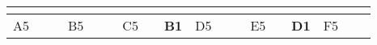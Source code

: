 \begin{landscape}
\begin{table}[h!]
\begin{tabular}{lcllcllcllcllcllcl}
                          & \multicolumn{1}{l}{}                                                                                                     &                              &                                                 & \multicolumn{1}{l}{}                                                                                                                                &                                                       &                         & \multicolumn{1}{l}{}                                                                                                     &                               &                                                 & \multicolumn{1}{l}{}                                                                                                                      &                                                       &                         & \multicolumn{1}{l}{}                                                                                                                &                               &                                                 & \multicolumn{1}{l}{}                                                                                                                                  &                                                       \\ \hline
\multicolumn{1}{|l|}{A5}  & \multicolumn{1}{c|}{}                                                                                                    & \multicolumn{1}{l|}{}        & \multicolumn{1}{l|}{\cellcolor[HTML]{C0C0C0}B5} & \multicolumn{1}{c|}{\cellcolor[HTML]{C0C0C0}}                                                                                                       & \multicolumn{1}{l|}{\cellcolor[HTML]{C0C0C0}{\bf A5}} & \multicolumn{1}{l|}{C5} & \multicolumn{1}{c|}{}                                                                                                    & \multicolumn{1}{l|}{{\bf B1}} & \multicolumn{1}{l|}{\cellcolor[HTML]{C0C0C0}D5} & \multicolumn{1}{c|}{\cellcolor[HTML]{C0C0C0}}                                                                                             & \multicolumn{1}{l|}{\cellcolor[HTML]{C0C0C0}{\bf C2}} & \multicolumn{1}{l|}{E5} & \multicolumn{1}{c|}{}                                                                                                               & \multicolumn{1}{l|}{{\bf D1}} & \multicolumn{1}{l|}{\cellcolor[HTML]{C0C0C0}F5} & \multicolumn{1}{c|}{\cellcolor[HTML]{C0C0C0}}                                                                                                         & \multicolumn{1}{l|}{\cellcolor[HTML]{C0C0C0}}         \\ \cline{1-1} \cline{3-4} \cline{6-7} \cline{9-10} \cline{12-13} \cline{15-16} \cline{18-18} 

\end{tabular}
\end{table}
\end{landscape}
